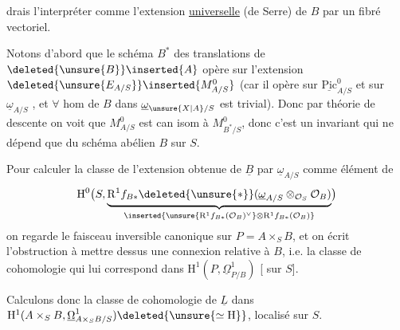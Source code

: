 drais l'interpréter comme l'extension \uline{universelle} (de Serre) de $B$ par un fibré vectoriel.

Notons d'abord que le schéma $B^*$ des translations de $\deleted{\unsure{B}}\inserted{A}$ opère  sur l'extension $\deleted{\unsure{E_{A/S}}}\inserted{M^0_{A/S}}$ (car il opère  sur $\underline{\mathrm{Pic}}^0_{A/S}$ et sur $\underline{\omega}_{A/S}$ \deleted{\unsure{\}}}, et $\forall$ hom de $B$ dans $\underline{\omega}_{\unsure{X|A}/S}$ est trivial). Donc par théorie de descente on voit que $M^0_{A/S}$ est can isom à $M^0_{B^*/S}$, donc c'est un invariant qui ne dépend que du  schéma abélien $B$ sur $S$.

Pour calculer la classe de l'extension obtenue de $\underline{B}$ par $\underline{\omega}_{A/S}$ comme élément de
\[
\mathrm{H}^0\bigl(S,\underbrace{\mathrm{R}^1f_{B*}\deleted{\unsure{*}}(\underline{\omega}_{A/S}\otimes_{\mathcal{O}_S}\mathcal{O}_B)}_{\inserted{\unsure{\mathrm{R}^1f_{B*}(\mathcal{O}_B)^\vee}\otimes\mathrm{R}^1f_{B*}(\mathcal{O}_B)}}\bigr)
\]
on regarde  le faisceau inversible canonique sur $P=A\times_S B$, et on écrit l'obstruction à mettre dessus une connexion relative à $B$, i.e. la classe de cohomologie qui lui correspond dans $\mathrm{H}^1(P,\underline{\Omega}^1_{P/B})$ [ sur $S$].

Calculons donc la classe de cohomologie de $\underline{L}$ dans $\mathrm{H}^1(A\times_S B,\underline{\Omega}^1_{A\times_S B/S})\deleted{\unsure{\simeq\mathrm{H}}}$, localisé sur $S$.
